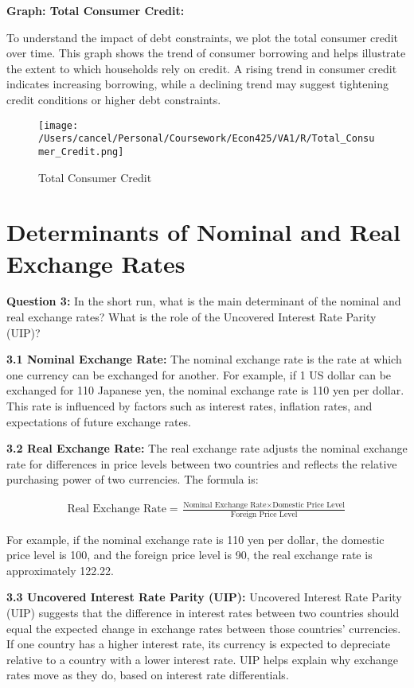 \documentclass{article}
\begin{document}
\textbf{Graph: Total Consumer Credit:} 

To understand the impact of debt constraints, we plot the total consumer credit over time. This graph shows the trend of consumer borrowing and helps illustrate the extent to which households rely on credit. A rising trend in consumer credit indicates increasing borrowing, while a declining trend may suggest tightening credit conditions or higher debt constraints.

\begin{figure}[h!]
    \centering
    \texttt{[image: /Users/cancel/Personal/Coursework/Econ425/VA1/R/Total\_Consumer\_Credit.png]}
    \caption{Total Consumer Credit}
\end{figure}

\hrulefill

\section{Determinants of Nominal and Real Exchange Rates}

\textbf{Question 3:} In the short run, what is the main determinant of the nominal and real exchange rates? What is the role of the Uncovered Interest Rate Parity (UIP)?

\textbf{3.1 Nominal Exchange Rate:} The nominal exchange rate is the rate at which one currency can be exchanged for another. For example, if 1 US dollar can be exchanged for 110 Japanese yen, the nominal exchange rate is 110 yen per dollar. This rate is influenced by factors such as interest rates, inflation rates, and expectations of future exchange rates.

\textbf{3.2 Real Exchange Rate:} The real exchange rate adjusts the nominal exchange rate for differences in price levels between two countries and reflects the relative purchasing power of two currencies. The formula is:

\begin{align*}
    \text{Real Exchange Rate} = \frac{\text{Nominal Exchange Rate} \times \text{Domestic Price Level}}{\text{Foreign Price Level}}
\end{align*}

For example, if the nominal exchange rate is 110 yen per dollar, the domestic price level is 100, and the foreign price level is 90, the real exchange rate is approximately 122.22.

\textbf{3.3 Uncovered Interest Rate Parity (UIP):} Uncovered Interest Rate Parity (UIP) suggests that the difference in interest rates between two countries should equal the expected change in exchange rates between those countries’ currencies. If one country has a higher interest rate, its currency is expected to depreciate relative to a country with a lower interest rate. UIP helps explain why exchange rates move as they do, based on interest rate differentials.
\end{document}
